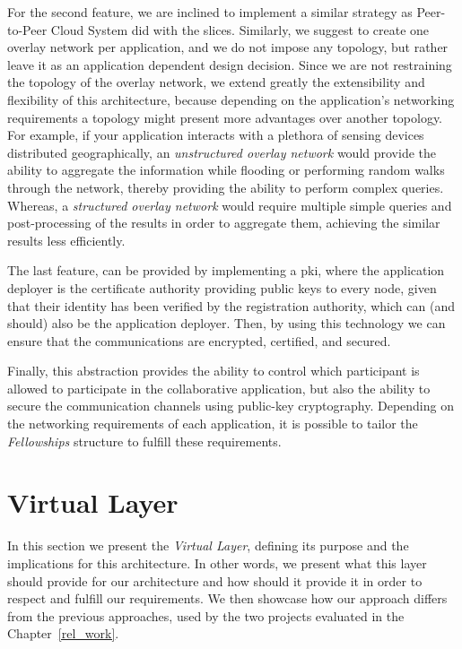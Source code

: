 \documentclass[12pt, titlepage]{uo_temp}
\begin{document}
     For the second feature, we are inclined to implement a similar strategy as
     Peer-to-Peer Cloud System did with the slices. Similarly, we suggest to create one
     overlay network per application, and we do not impose any topology, but rather leave
     it as an application dependent design decision. Since we are not restraining the
     topology of the overlay network, we extend greatly the extensibility and flexibility
     of this architecture, because depending on the application's networking requirements
     a topology might present more advantages over another topology. For example, if your
     application interacts with a plethora of sensing devices distributed geographically,
     an \emph{unstructured overlay network} would provide the ability to aggregate the
     information while flooding or performing random walks through the network, thereby
     providing the ability to perform complex queries. Whereas, a \emph{structured overlay
       network} would require multiple simple queries and post-processing of the results
     in order to aggregate them, achieving the similar results less efficiently.

     The last feature, can be provided by implementing a \gls{pki}, where the application
     deployer is the certificate authority providing public keys to every node, given that
     their identity has been verified by the registration authority, which can (and
     should) also be the application deployer. Then, by using this technology we can
     ensure that the communications are encrypted, certified, and secured.

     Finally, this abstraction provides the ability to control which participant is
     allowed to participate in the collaborative application, but also the ability to
     secure the communication channels using public-key cryptography. Depending on
     the networking requirements of each application, it is possible to tailor the
     \emph{Fellowships} structure to fulfill these requirements.     

     \section{Virtual Layer}
     In this section we present the \emph{Virtual Layer}, defining its purpose and the
     implications for this architecture. In other words, we present what this layer should
     provide for our architecture and how should it provide it in order to respect and
     fulfill our requirements. We then showcase how our approach differs from the previous
     approaches, used by the two projects evaluated in the Chapter~\ref{rel_work}.
     
\end{document}
